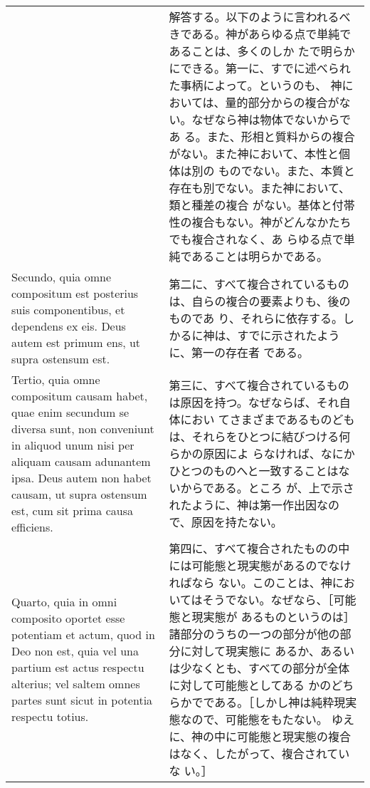\documentclass[10pt]{jsarticle} %
\begin{document}
\begin{longtable}{p{21em}p{21em}}
&

解答する。以下のように言われるべきである。神があらゆる点で単純であることは、多くのしか
 たで明らかにできる。第一に、すでに述べられた事柄によって。というのも、
 神においては、量的部分からの複合がない。なぜなら神は物体でないからであ
 る。また、形相と質料からの複合がない。また神において、本性と個体は別の
 ものでない。また、本質と存在も別でない。また神において、類と種差の複合
 がない。基体と付帯性の複合もない。神がどんなかたちでも複合されなく、あ
 らゆる点で単純であることは明らかである。

\\


Secundo, quia omne compositum est posterius suis componentibus, et
 dependens ex eis. Deus autem est primum ens, ut supra ostensum est.

&

第二に、すべて複合されているものは、自らの複合の要素よりも、後のものであ
 り、それらに依存する。しかるに神は、すでに示されたように、第一の存在者
 である。

\\

Tertio, quia omne compositum causam habet, quae enim secundum se diversa
 sunt, non conveniunt in aliquod unum nisi per aliquam causam adunantem
 ipsa. Deus autem non habet causam, ut supra ostensum est, cum sit prima
 causa efficiens.

&

第三に、すべて複合されているものは原因を持つ。なぜならば、それ自体におい
 てさまざまであるものどもは、それらをひとつに結びつける何らかの原因によ
 らなければ、なにかひとつのものへと一致することはないからである。ところ
 が、上で示されたように、神は第一作出因なので、原因を持たない。

\\

Quarto, quia in omni composito oportet esse potentiam et actum, quod in
 Deo non est, quia vel una partium est actus respectu alterius; vel
 saltem omnes partes sunt sicut in potentia respectu totius.

&

第四に、すべて複合されたものの中には可能態と現実態があるのでなければなら
 ない。このことは、神においてはそうでない。なぜなら、［可能態と現実態が
 あるものというのは］諸部分のうちの一つの部分が他の部分に対して現実態に
 あるか、あるいは少なくとも、すべての部分が全体に対して可能態としてある
 かのどちらかでである。［しかし神は純粋現実態なので、可能態をもたない。
 ゆえに、神の中に可能態と現実態の複合はなく、したがって、複合されていな
 い。］


\end{longtable}
\end{document}

